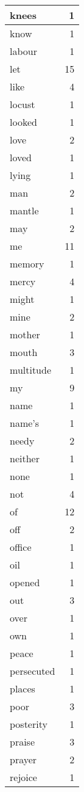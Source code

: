\begin{center}
\begin{longtable}{l|r}
knees & 1 \\ \hline
know & 1 \\ \hline
labour & 1 \\ \hline
let & 15 \\ \hline
like & 4 \\ \hline
locust & 1 \\ \hline
looked & 1 \\ \hline
love & 2 \\ \hline
loved & 1 \\ \hline
lying & 1 \\ \hline
man & 2 \\ \hline
mantle & 1 \\ \hline
may & 2 \\ \hline
me & 11 \\ \hline
memory & 1 \\ \hline
mercy & 4 \\ \hline
might & 1 \\ \hline
mine & 2 \\ \hline
mother & 1 \\ \hline
mouth & 3 \\ \hline
multitude & 1 \\ \hline
my & 9 \\ \hline
name & 1 \\ \hline
name's & 1 \\ \hline
needy & 2 \\ \hline
neither & 1 \\ \hline
none & 1 \\ \hline
not & 4 \\ \hline
of & 12 \\ \hline
off & 2 \\ \hline
office & 1 \\ \hline
oil & 1 \\ \hline
opened & 1 \\ \hline
out & 3 \\ \hline
over & 1 \\ \hline
own & 1 \\ \hline
peace & 1 \\ \hline
persecuted & 1 \\ \hline
places & 1 \\ \hline
poor & 3 \\ \hline
posterity & 1 \\ \hline
praise & 3 \\ \hline
prayer & 2 \\ \hline
rejoice & 1 \\ \hline

\end{longtable}
\end{center}
